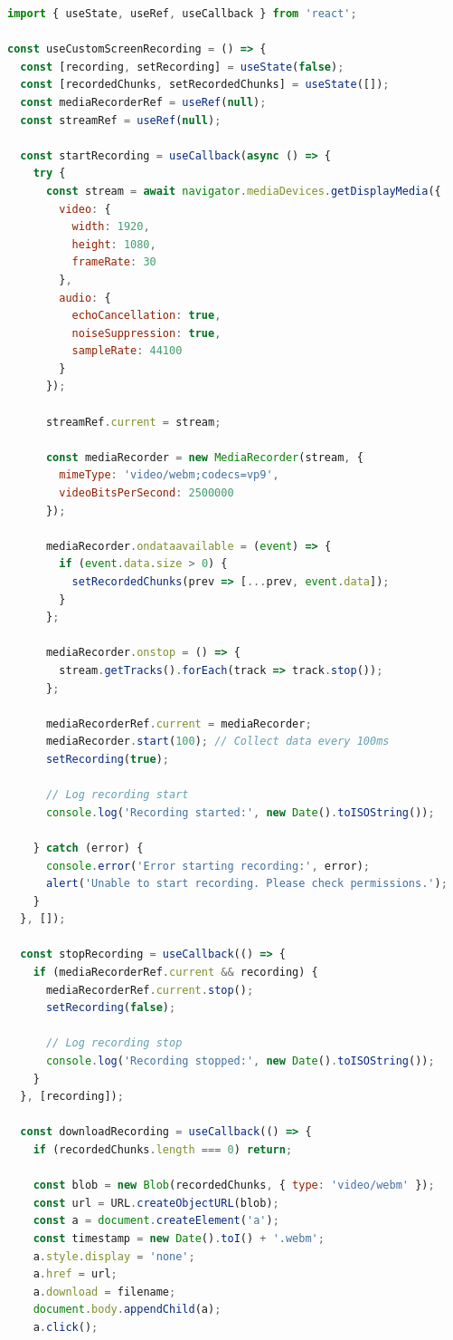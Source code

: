 \documentclass[12pt, a4paper]{article}
\begin{document}
\begin{lstlisting}[language=JavaScript, caption=Custom Recording Hook]
import { useState, useRef, useCallback } from 'react';

const useCustomScreenRecording = () => {
  const [recording, setRecording] = useState(false);
  const [recordedChunks, setRecordedChunks] = useState([]);
  const mediaRecorderRef = useRef(null);
  const streamRef = useRef(null);
  
  const startRecording = useCallback(async () => {
    try {
      const stream = await navigator.mediaDevices.getDisplayMedia({
        video: {
          width: 1920,
          height: 1080,
          frameRate: 30
        },
        audio: {
          echoCancellation: true,
          noiseSuppression: true,
          sampleRate: 44100
        }
      });
      
      streamRef.current = stream;
      
      const mediaRecorder = new MediaRecorder(stream, {
        mimeType: 'video/webm;codecs=vp9',
        videoBitsPerSecond: 2500000
      });
      
      mediaRecorder.ondataavailable = (event) => {
        if (event.data.size > 0) {
          setRecordedChunks(prev => [...prev, event.data]);
        }
      };
      
      mediaRecorder.onstop = () => {
        stream.getTracks().forEach(track => track.stop());
      };
      
      mediaRecorderRef.current = mediaRecorder;
      mediaRecorder.start(100); // Collect data every 100ms
      setRecording(true);
      
      // Log recording start
      console.log('Recording started:', new Date().toISOString());
      
    } catch (error) {
      console.error('Error starting recording:', error);
      alert('Unable to start recording. Please check permissions.');
    }
  }, []);
  
  const stopRecording = useCallback(() => {
    if (mediaRecorderRef.current && recording) {
      mediaRecorderRef.current.stop();
      setRecording(false);
      
      // Log recording stop
      console.log('Recording stopped:', new Date().toISOString());
    }
  }, [recording]);
  
  const downloadRecording = useCallback(() => {
    if (recordedChunks.length === 0) return;
    
    const blob = new Blob(recordedChunks, { type: 'video/webm' });
    const url = URL.createObjectURL(blob);
    const a = document.createElement('a');
    const timestamp = new Date().toI() + '.webm';
    a.style.display = 'none';
    a.href = url;
    a.download = filename;
    document.body.appendChild(a);
    a.click();
    

\end{lstlisting}
\end{document}
